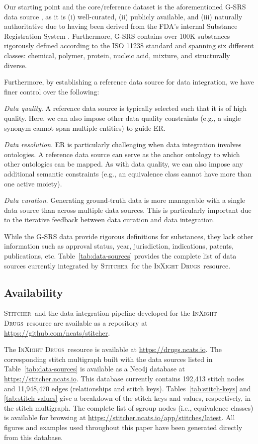 \documentclass{bmcart}
\newcommand\st{\textsc{Stitcher}}
\newcommand\ix{\textsc{InXight Drugs}}
\begin{document}
Our starting point and the core/reference dataset is the
aforementioned G-SRS data source \cite{GSRSData}, as it is (i)
well-curated, (ii) publicly available, and (iii) naturally
authoritative due to having been derived from the FDA’s internal
Substance Registration System \cite{GSRS}. Furthermore, G-SRS contains
over 100K substances rigorously defined according to the ISO 11238
standard and spanning six different classes: chemical, polymer,
protein, nucleic acid, mixture, and structurally diverse.

Furthermore, by establishing a reference data source
for data integration, we have finer control over the following: 
\begin{description}
\item{\emph{Data quality}.} A reference data source is typically
selected such that it is of high quality. Here, we can also impose
other data quality constraints (e.g., a single synonym cannot span
multiple entities) to guide ER. 
\item{\emph{Data resolution}.} ER is particularly
challenging when data integration involves ontologies. A reference
data source can serve as the anchor ontology to which other
ontologies can be mapped. As with data quality, we can also impose any
additional semantic constraints (e.g., an equivalence class cannot
have more than one active moiety). 
\item{\emph{Data curation}.} Generating ground-truth data is more
manageable with a single data source than across multiple data sources.
This is particularly important due to the iterative feedback between
data curation and data integration. 
\end{description}
While the G-SRS data provide rigorous definitions for substances, they lack
other information such as approval status, year, jurisdiction,
indications, patents, publications, etc. Table~\ref{tab:data-sources}
provides the complete list of data sources currently integrated by
\st\ for the \ix\ resource.

\subsection*{Availability}
\st\ and the data integration pipeline developed for the \ix\ resource 
are available as a repository at \url{https://github.com/ncats/stitcher}.

The \ix\ resource is available at \url{https://drugs.ncats.io}. The
corresponding stitch multigraph built with the data sources listed in
Table~\ref{tab:data-sources} is available as a Neo4j database  at
\url{https://stitcher.ncats.io}. This database currently
contains 192,413 stitch nodes and 11,948,470 edges (relationships and
stitch keys). Tables~\ref{tab:stitch-keys} and \ref{tab:stitch-values}  
give a breakdown of the stitch keys and values, respectively, in the
stitch multigraph. The complete list of sgroup nodes (i.e.,
equivalence classes) is available for browsing at 
\url{https://stitcher.ncats.io/app/stitches/latest}. All figures and
examples used throughout this paper have been generated directly from
this database.
\end{document}
